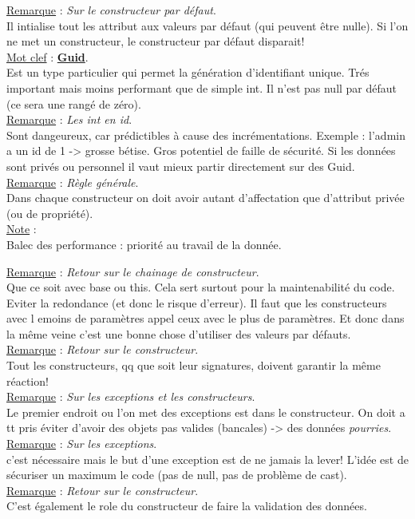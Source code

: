 \documentclass[a4paper,12pt,twoside]{article}
\newcommand{\urlcolor}{magenta}  %
\newcommand{\keycolor}{purple} %
\newcommand{\incode}[1]{{\footnotesize\ttfamily #1}} %
\newcommand{\rem}[2]{\noindent\underline{Remarque} : \textit{#1}.\\ \indent #2}
\newcommand{\note}[1]{\noindent\underline{Note} : \\ \indent #1}
\newcommand{\keyref}[2]{\hypersetup{urlcolor=\keycolor} \href{#1}{\textbf{#2}}\hypersetup{urlcolor=\urlcolor}}
\newcommand{\keyword}[3]{\noindent\underline{Mot clef} : \keyref{#1}{#2}. \\ \indent #3}
\begin{document}
\rem{Sur le constructeur par défaut}{Il intialise tout les attribut aux valeurs par défaut (qui peuvent être nulle). Si l'on ne met un constructeur, le constructeur par défaut disparait!}\\

\keyword{https://docs.microsoft.com/fr-fr/dotnet/api/system.guid?view=net-6.0}{Guid}{Est un type particulier qui permet la génération d'identifiant unique. Trés important mais moins performant que de simple \incode{int}. Il n'est pas \incode{null} par défaut (ce sera une rangé de zéro).}\\

\rem{Les \incode{int} en id}{Sont dangeureux, car prédictibles à cause des incrémentations. Exemple : l'admin a un id de 1 -> grosse bétise. Gros potentiel de faille de sécurité. Si les données sont privés ou personnel il vaut mieux partir directement sur des Guid.}\\

\rem{Règle générale}{Dans chaque constructeur on doit avoir autant d'affectation que d'attribut privée (ou de propriété).}\\

\note{Balec des performance : priorité au travail de la donnée.}

\rem{Retour sur le chainage de constructeur}{Que ce soit avec \incode{base} ou \incode{this}. Cela sert surtout pour la maintenabilité du code. Eviter la redondance (et donc le risque d'erreur). Il faut que les constructeurs avec l emoins de paramètres appel ceux avec le plus de paramètres. Et donc dans la même veine c'est une bonne chose d'utiliser des valeurs par défauts.}\\

\rem{Retour sur le constructeur}{Tout les constructeurs, qq que soit leur signatures, doivent garantir la même réaction!}\\

\rem{Sur les exceptions et les constructeurs}{Le premier endroit ou l'on met des exceptions est dans le constructeur. On doit a tt pris éviter d'avoir des objets pas valides (bancales) -> des données \textit{pourries}.}\\

\rem{Sur les exceptions}{c'est nécessaire mais le but d'une exception est de ne jamais la lever! L'idée est de sécuriser un maximum le code (pas de \incode{null}, pas de problème de \incode{cast}).}\\

\rem{Retour sur le constructeur}{C'est également le role du constructeur de faire la validation des données.}\\
\end{document}
